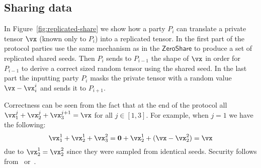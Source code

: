 \subsection{Sharing data}

In Figure~\ref{fig:replicated-share} we show how a party $P_i$ can translate a private tensor $\vx$ (known only to $P_i$) into a replicated tensor. In the first part of the protocol parties use the same mechanism as in the $\mathsf{ZeroShare}$ to produce a set of replicated shared seeds. Then $P_i$ sends to $P_{i-1}$ the shape of $\vx$ in order for $P_{i-1}$ to derive a correct sized random tensor using the shared seed. In the last part the inputting party $P_i$ masks the private tensor with a random value $\vx - \vx_i^i$ and sends it to $P_{i+1}$.

Correctness can be seen from the fact that at the end of the protocol all $\vx_1^j + \vx_2^j + \vx_3^{j+1} = \vx$ for all $j \in [1,3]$. For example, when $j = 1$ we have the following:
$$\vx_1^1 + \vx_2^1 + \vx_3^2 = \mathbf{0} + \vx_2^1 + (\vx - \vx_2^2) = \vx $$ due to $\vx_2^1 = \vx_2^2$ since they were sampled from identical seeds. Security follows from~\cite{CCS:ABFLNO16} or~\cite{CCS:MohRin18}.



